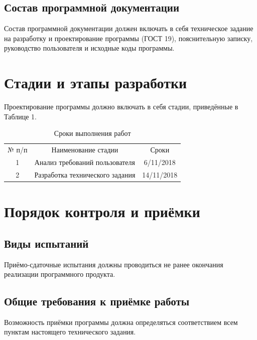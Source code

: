 \documentclass{article}
\begin{document}
    \subsection{Состав программной документации}
    Состав программной документации должен включать в себя техническое задание на разработку и проектирование программы (ГОСТ 19), пояснительную записку, руководство пользователя и исходные коды программы.
    
\section{Стадии и этапы разработки}
Проектирование программы должно включать в себя стадии, приведённые в Таблице 1.\\
\begin{table}[h!]
    \begin{center}
    \caption{Сроки выполнения работ}
    \label{tab:table1}
      \begin{tabular}{c|c|c}
№ п/п & Наименование стадии             & Сроки         \\
1     & Анализ требований пользователя  & 6/11/2018     \\
2     & Разработка технического задания & 14/11/2018     \\
        \end{tabular}
        \end{center}
\end{table}

\section{Порядок контроля и приёмки}
    \subsection{Виды испытаний}
    Приёмо-сдаточные испытания должны проводиться не ранее окончания реализации программного продукта.
    \subsection{Общие требования к приёмке работы}
    Возможность приёмки программы должна определяться соответствием всем пунктам настоящего технического задания.

\newpage
{}
\recalctypearea
\end{document}
